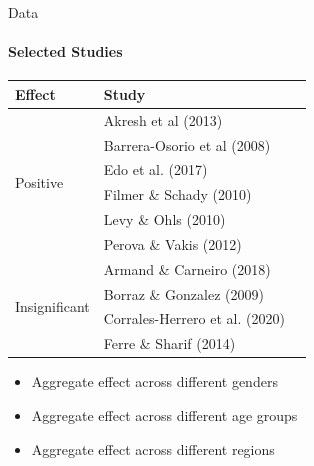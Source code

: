 \documentclass{beamer}
\begin{document}
\begin{frame}{Data}
\framesubtitle{Selected Studies}


\begin{table}[!htbp]
    \scriptsize
    \centering
    \begin{tabular}{ lll } 
    \hline\hline
    \textbf{Effect} & \textbf{Study} \\
    \hline
    \multirow{6}{6em}{Positive} 
    & Akresh et al (2013)             \\ 
    & Barrera-Osorio et al (2008)     \\ 
    & Edo et al. (2017)               \\ 
    & Filmer \& Schady (2010)         \\ 
    & Levy \& Ohls (2010)             \\ 
    & Perova \& Vakis (2012)          \\ 
    \hline
    \multirow{4}{4em}{Insignificant} 
    & Armand \& Carneiro (2018)       \\ 
    & Borraz \& Gonzalez (2009)       \\ 
    & Corrales-Herrero et al. (2020)  \\ 
    & Ferre \& Sharif (2014)          \\ 
    \hline\hline
    \end{tabular}
\end{table}

\begin{itemize}
    \item Aggregate effect across different genders
    \item Aggregate effect across different age groups
    \item Aggregate effect across different regions
\end{itemize}

\end{frame}



\end{document}
